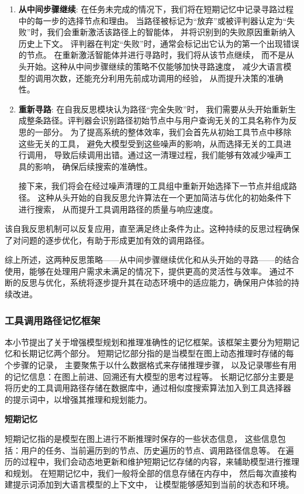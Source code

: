 \begin{enumerate}
  \item \textbf{从中间步骤继续}: 在任务未完成的情况下，我们将在短期记忆中记录寻路过程中的每一步的选择节点和理由。
  当路径被标记为“放弃”或被评判器认定为“失败”时，我们会重新激活该路径上的智能体，
  并将识别到的失败原因重新纳入历史上下文。
  评判器在判定“失败”时，通常会标记出它认为的第一个出现错误的节点。
  在重新激活智能体并进行寻路时，我们将从该节点继续，
  而不是从头开始。这种从中间步骤继续的策略不仅能够加快寻路速度，
  减少大语言模型的调用次数，还能充分利用先前成功调用的经验，
  从而提升决策的准确性。
  \item \textbf{重新寻路}: 在自我反思模块认为路径“完全失败”时，
  我们需要从头开始重新生成整条路径。评判器会识别路径初始节点中与用户查询无关的工具名称作为反思的一部分。
  为了提高系统的整体效率，我们会首先从初始工具节点中移除这些无关的工具，
  避免大模型受到这些噪声的影响，从而选择无关的工具进行调用，
  导致后续调用出错。通过这一清理过程，我们能够有效减少噪声工具的影响，
  确保后续搜索的准确性。\par
  接下来，我们将会在经过噪声清理的工具组中重新开始选择下一节点并组成路径。
  这种从头开始的自我反思允许算法在一个更加简洁与优化的初始条件下进行搜索，
  从而提升工具调用路径的质量与响应速度。
\end{enumerate}
 
该自我反思机制可以反复应用，直至满足终止条件为止。这种持续的反思过程确保了对问题的逐步优化，有助于形成更加有效的调用路径。

综上所述，这两种反思策略——从中间步骤继续优化和从头开始的寻路——的结合使用，能够在处理用户需求未满足的情况下，提供更高的灵活性与效率。
通过不断的反思与优化，系统将逐步提升其在动态环境中的适应能力，确保用户体验的持续改进。

\subsubsection{工具调用路径记忆框架}

本小节提出了关于增强模型规划和推理准确性的记忆框架。该框架主要分为短期记忆和长期记忆两个部分。
短期记忆部分指的是当模型在图上动态推理时存储的每个步骤的记录，
主要聚焦于以什么数据格式来存储推理步骤，
以及记录哪些有用的记忆信息：在图上前进、回溯还有大模型的思考过程等。
长期记忆部分主要是将历史的工具调用路径存储在数据库中，通过相似度搜索算法加入到工具选择器
的提示词中，以增强其推理和规划能力。

\indent \textbf{短期记忆}

短期记忆指的是模型在图上进行不断推理时保存的一些状态信息，
这些信息包括：用户的任务、当前遍历到的节点、历史遍历的节点、调用路径信息等。
在遍历的过程中，我们会动态地更新和维护短期记忆存储的内容，来辅助模型进行推理和规划。
在短期记忆中，我们一般将全部的信息存储在内存中，
然后每次直接构建提示词添加到大语言模型的上下文中，
让模型能够感知到当前的状态和环境。

